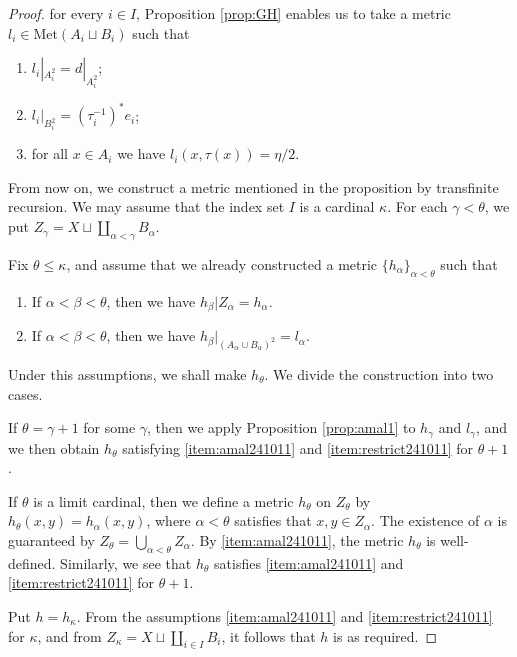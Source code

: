 \documentclass[a4paper, 12pt]{amsart}
\theoremstyle{plain}
\theoremstyle{definition}
\theoremstyle{remark}
\newcommand{\met}[1]{\mathrm{Met}(#1)}
\begin{document}
\begin{proof}
for every  
$i\in I$, 
Proposition \ref{prop:GH}
enables us to 
take   a metric 
$l_{i}\in \met{A_{i}\sqcup B_{i}}$ 
such that 
\begin{enumerate}[label=\textup{(a\arabic*)}]
	\item $l_{i}|_{A_{i}^2}=d|_{A_{i}^2}$;
	\item $l_{i}|_{B_{i}^2}=(\tau_i^{-1})^{*}e_{i}$; 
	\item for all $x\in A_i$ 
	we have $l_{i}(x, \tau(x))= \eta/2$. 
\end{enumerate}
From now on, 
 we construct a metric mentioned in the proposition 
by transfinite recursion.
We may assume that 
the index set $I$ is a cardinal 
$\kappa$. 
For each 
$\gamma<\theta$, 
we put 
$Z_{\gamma}=X\sqcup\coprod_{\alpha<\gamma}B_{\alpha}$. 

Fix 
$\theta\le \kappa$, 
and 
assume that 
we already constructed a metric 
$\{h_{\alpha}\}_{\alpha<\theta}$
 such that 
\begin{enumerate}[label=\textup{(b\arabic*)}]

\item\label{item:amal241011}
If $\alpha<\beta<\theta$, 
then we have 
$h_{\beta}|Z_{\alpha}=h_{\alpha}$. 

\item\label{item:restrict241011}
If 
$\alpha<\beta<\theta$, 
then 
we have 
$h_{\beta}|_{(A_{\alpha}\cup B_{\alpha})^{2}}=l_{\alpha}$. 
\end{enumerate}


Under this assumptions, 
we shall make 
$h_{\theta}$. 
We divide the 
construction into 
two cases. 

If $\theta=\gamma+1$ for some $\gamma$, 
then 
we 
apply
Proposition 
\ref{prop:amal1}
 to 
$h_{\gamma}$ 
and 
$l_{\gamma}$, 
and 
we then  obtain 
$h_{\theta}$
satisfying 
\ref{item:amal241011}
and 
\ref{item:restrict241011}
for $\theta+1$. 

If 
$\theta$ is a limit cardinal, 
then 
we define 
a metric 
$h_{\theta}$  on 
$Z_{\theta}$ by 
$h_{\theta}(x, y)=h_{\alpha}(x, y)$, 
where $\alpha<\theta$ satisfies 
that 
$x, y\in Z_{\alpha}$. 
The existence of $\alpha$ is guaranteed by 
$Z_{\theta}=\bigcup_{\alpha<\theta}Z_{\alpha}$. 
By \ref{item:amal241011}, 
the metric 
$h_{\theta}$ is well-defined. 
Similarly, 
we see that 
$h_{\theta}$
satisfies 
\ref{item:amal241011}
and 
\ref{item:restrict241011}
for $\theta+1$. 


Put 
$h=h_{\kappa}$. 
From the assumptions 
 \ref{item:amal241011}
 and 
  \ref{item:restrict241011} for $\kappa$, 
  and from 
$Z_{\kappa}=X\sqcup \coprod_{i\in I}B_{i}$, 
it follows that 
$h$ 
is as required. 
\end{proof}
\end{document}
